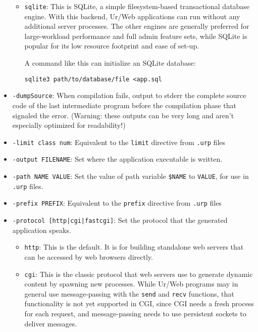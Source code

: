 \documentclass{article}
\begin{document}
\begin{itemize}
\begin{itemize}
  \item \texttt{sqlite}: This is SQLite, a simple filesystem-based transactional database engine.  With this backend, Ur/Web applications can run without any additional server processes.  The other engines are generally preferred for large-workload performance and full admin feature sets, while SQLite is popular for its low resource footprint and ease of set-up.

    A command like this can initialize an SQLite database:
    \begin{verbatim}
sqlite3 path/to/database/file <app.sql
    \end{verbatim}
  \end{itemize}

\item \texttt{-dumpSource}: When compilation fails, output to stderr the complete source code of the last intermediate program before the compilation phase that signaled the error.  (Warning: these outputs can be very long and aren't especially optimized for readability!)

\item \texttt{-limit class num}: Equivalent to the \texttt{limit} directive from \texttt{.urp} files

\item \texttt{-output FILENAME}: Set where the application executable is written.

\item \texttt{-path NAME VALUE}: Set the value of path variable \texttt{\$NAME} to \texttt{VALUE}, for use in \texttt{.urp} files.

\item \texttt{-prefix PREFIX}: Equivalent to the \texttt{prefix} directive from \texttt{.urp} files

\item \texttt{-protocol [http|cgi|fastcgi]}: Set the protocol that the generated application speaks.
  \begin{itemize}
  \item \texttt{http}: This is the default.  It is for building standalone web servers that can be accessed by web browsers directly.

  \item \texttt{cgi}: This is the classic protocol that web servers use to generate dynamic content by spawning new processes.  While Ur/Web programs may in general use message-passing with the \texttt{send} and \texttt{recv} functions, that functionality is not yet supported in CGI, since CGI needs a fresh process for each request, and message-passing needs to use persistent sockets to deliver messages.


\end{itemize}
\end{itemize}
\end{document}
